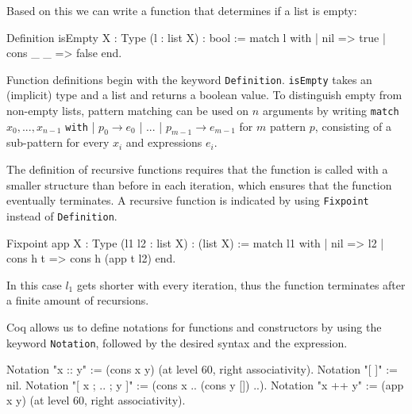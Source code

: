 \documentclass[fleqn]{scrreprt}
\newcommand{\coqinline}[1]{\texttt{#1}}
\begin{document}
Based on this we can write a function that determines if a list is empty:
\begin{coqcode}
Definition isEmpty {X : Type} (l : list X) : bool := 
  match l with
  | nil      => true
  | cons _ _ => false
  end.
\end{coqcode}
Function definitions begin with the keyword \coqinline{Definition}. \coqinline{isEmpty} takes an (implicit) type and a list and returns a boolean value.
To distinguish empty from non-empty lists, pattern matching can be used on $n$ arguments by writing \coqinline{match} $x_{0},...,x_{n-1}$ \coqinline{with} | $p_{0} \rightarrow e_{0}$ | ... | $p_{m-1} \rightarrow e_{m-1}$ for $m$ pattern $p$, consisting of a sub-pattern for every $x_{i}$ and expressions $e_{i}$.

The definition of recursive functions requires that the function is called with a smaller structure than before in each iteration, which ensures that the function eventually terminates. A recursive function is indicated by using \coqinline{Fixpoint} instead of \coqinline{Definition}.
\begin{coqcode}
Fixpoint app {X : Type} (l1 l2 : list X) : (list X) :=
  match l1 with
  | nil => l2
  | cons h t => cons h (app t l2)
  end.
\end{coqcode}
In this case $l_{1}$ gets shorter with every iteration, thus the function terminates after a finite amount of recursions. 

Coq allows us to define notations for functions and constructors by using the keyword \coqinline{Notation}, followed by the desired syntax and the expression. 
\begin{coqcode}
Notation "x :: y" := (cons x y) (at level 60, right associativity).
Notation "[ ]" := nil.
Notation "[ x ; .. ; y ]" := (cons x .. (cons y []) ..).
Notation "x ++ y" := (app x y) (at level 60, right associativity).
\end{coqcode}
\end{document}
